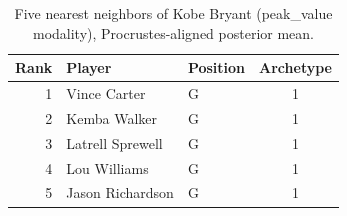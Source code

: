 \begin{table}[htbp]
  \centering\small
  \begin{tabular}{rllc}
    \toprule
    Rank & Player & Position & Archetype \\
    \midrule
    1 & Vince Carter & G & 1 \\
    2 & Kemba Walker & G & 1 \\
    3 & Latrell Sprewell & G & 1 \\
    4 & Lou Williams & G & 1 \\
    5 & Jason Richardson & G & 1 \\
    \bottomrule
  \end{tabular}
  \caption{Five nearest neighbors of Kobe Bryant (peak_value modality), Procrustes-aligned posterior mean.}
  \label{tab:Kobe_Bryant_neighbors_peak_value}
\end{table}

